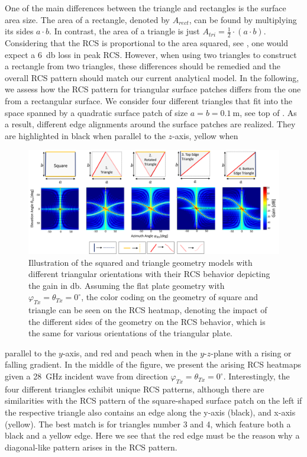 One of the main differences between the triangle and rectangles is the surface area size. The area of a rectangle, denoted by $A_{rect}$, can be found by multiplying its sides $a\cdot b$. In contrast, the area of a triangle is just $A_{tri} = \frac{1}{2}\cdot (a\cdot b)$. Considering that the RCS is proportional to the area squared, see , one would expect a \SI{6}{\decibel} loss in peak RCS. However, when using two triangles to construct a rectangle from two triangles, these differences should be remedied and the overall RCS pattern should match our current analytical model. In the following, we assess how the RCS pattern for triangular surface patches differs from the one from a rectangular surface. We consider four different triangles that fit into the space spanned by a quadratic surface patch of size $a=b=\SI{0.1}{\meter}$, see top of . As a result, different edge alignments around the surface patches are realized. They are highlighted in black when parallel to the $z$-axis, yellow when 
\begin{figure}[tb]
	\centering
	\includegraphics[width=1.0\linewidth]{images/Section 4 Images/Triangle_square}
	\caption{Illustration of the squared and triangle geometry models with different triangular orientations with their RCS behavior depicting the gain in \si{\decibel}. Assuming the flat plate geometry with $\varphi_{Tx}=\theta_{Tx}=0^\circ$, the color coding on the geometry of square and triangle can be seen on the RCS heatmap, denoting the impact of the different sides of the geometry on the RCS behavior, which is the same for various orientations of the triangular plate.}
	\label{fig:Triangle_square}
\end{figure}
parallel to the $y$-axis, and red and peach when in the $y$-$z$-plane with a rising or falling gradient. In the middle of the figure, we present the arising RCS heatmaps given a \SI{28}{\giga\hertz} incident wave from direction $\varphi_{Tx}=\theta_{Tx}=0^\circ$. Interestingly, the four different triangles exhibit unique RCS patterns, although there are similarities with the RCS pattern of the square-shaped surface patch on the left if the respective triangle also contains an edge along the y-axis (black), and x-axis (yellow). The best match is for triangles number 3 and 4, which feature both a black and a yellow edge. Here we see that the red edge must be the reason why a diagonal-like pattern arises in the RCS pattern.  


